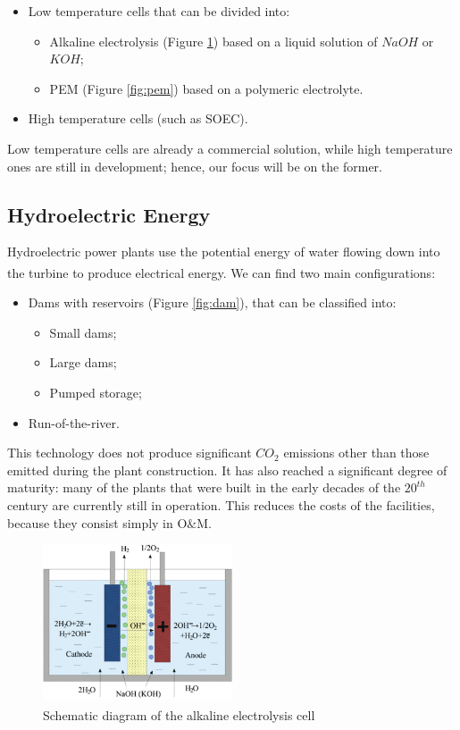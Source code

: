 \begin{itemize}
    \item Low temperature cells that can be divided into:
    \begin{itemize}
        \item Alkaline electrolysis (Figure \ref{fig:alkaline})  based on a liquid solution of $NaOH$ or $KOH$;
        \item PEM (Figure \ref{fig:pem}) based on a polymeric electrolyte.
    \end{itemize}
    \item High temperature cells (such as SOEC).
\end{itemize}

Low temperature cells are already a commercial solution, while high temperature ones are still in development; hence, our focus will be on the former.

\subsection{Hydroelectric Energy}
Hydroelectric power plants use the potential energy of water flowing down into the turbine to produce electrical energy. We can find two main configurations\textsuperscript{\cite{lakohydro2010}}:

\begin{itemize}
    \item Dams with reservoirs (Figure \ref{fig:dam}), that can be classified into:
    \begin{itemize}
        \item Small dams;
        \item Large dams;
        \item Pumped storage;
    \end{itemize}
    \item Run-of-the-river.
\end{itemize}

This technology does not produce significant $CO_2$ emissions other than those emitted during the plant construction. It has also reached a significant degree of maturity: many of the plants that were built in the early decades of the $20^{th}$ century are currently still in operation. This reduces the costs of the facilities, because they consist simply in O$\&$M.

\begin{figure}[p]
    \centering
    \includegraphics[width=0.5\textwidth]{Chapters/Pictures/Schematic-diagram-of-the-alkaline-electrolysis-cell-34.png}
    \caption{Schematic diagram of the alkaline electrolysis cell\textsuperscript{\cite{schemepictureelectrolysis}}}
    \label{fig:alkaline}
\end{figure}

